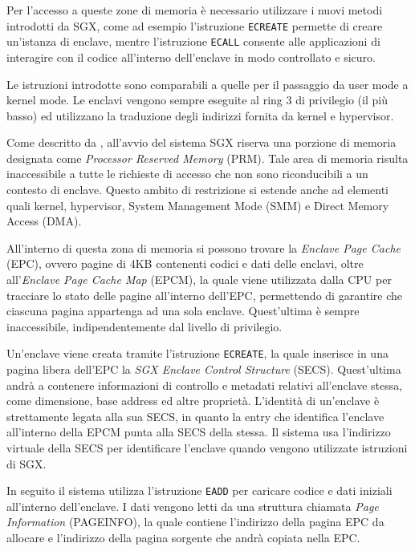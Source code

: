 \documentclass[12pt,italian]{report}
\begin{document}
	Per l'accesso a queste zone di memoria è necessario utilizzare i nuovi metodi introdotti da SGX, come ad esempio l'istruzione \texttt{ECREATE} permette di creare un'istanza di enclave, mentre l'istruzione \texttt{ECALL} consente alle applicazioni di interagire con il codice all'interno dell'enclave in modo controllato e sicuro. 
	
	Le istruzioni introdotte sono comparabili a quelle per il passaggio da user mode a kernel mode. Le enclavi vengono sempre eseguite al ring 3 di privilegio (il più basso) ed utilizzano la traduzione degli indirizzi fornita da kernel e hypervisor.
	
	\bigbreak
	
	Come descritto da \cite{sgx_explained}, all'avvio del sistema SGX riserva una porzione di memoria designata come \textit{Processor Reserved Memory} (PRM). Tale area di memoria risulta inaccessibile a tutte le richieste di accesso che non sono riconducibili a un contesto di enclave. Questo ambito di restrizione si estende anche ad elementi quali kernel, hypervisor, System Management Mode (SMM) e Direct Memory Access (DMA).
	
	All'interno di questa zona di memoria si possono trovare la \textit{Enclave Page Cache} (EPC), ovvero pagine di 4KB contenenti codici e dati delle enclavi, oltre all'\textit{Enclave Page Cache Map} (EPCM), la quale viene utilizzata dalla CPU per tracciare lo stato delle pagine all'interno dell'EPC, permettendo di garantire che ciascuna pagina appartenga ad una sola enclave. Quest'ultima è sempre inaccessibile, indipendentemente dal livello di privilegio.
	
	\bigbreak
	
	Un'enclave viene creata tramite l'istruzione \texttt{ECREATE}, la quale inserisce in una pagina libera dell'EPC la \textit{SGX Enclave Control Structure} (SECS). Quest'ultima andrà a contenere informazioni di controllo e metadati relativi all'enclave stessa, come dimensione, base address ed altre proprietà. L'identità di un'enclave è strettamente legata alla sua SECS, in quanto la entry che identifica l'enclave all'interno della EPCM punta alla SECS della stessa. Il sistema usa l'indirizzo virtuale della SECS per identificare l'enclave quando vengono utilizzate istruzioni di SGX.
	
	In seguito il sistema utilizza l'istruzione \texttt{EADD} per caricare codice e dati iniziali all'interno dell'enclave. I dati vengono letti da una struttura chiamata \textit{Page Information} (PAGEINFO), la quale contiene l'indirizzo della pagina EPC da allocare e l'indirizzo della pagina sorgente che andrà copiata nella EPC.
	
\end{document}
